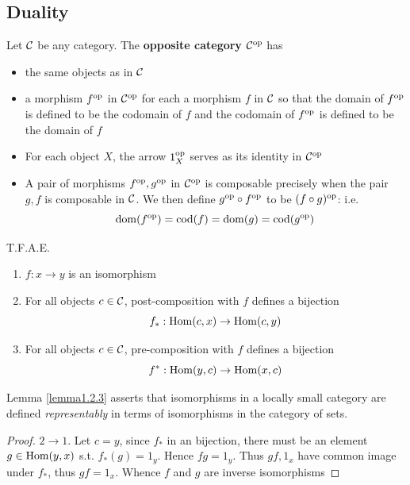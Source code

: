 \documentclass[11pt]{article}
\def \Cop {\calc^{\op}}
\def \fop {f^{\op}}
\def \gop {g^{\op}}
\begin{document}
\subsection{Duality}
\label{sec:orgc070e96}
\begin{definition}[]
Let \(\mathcal{C}\) be any category. The \textbf{opposite category} \(\mathcal{C}^{\operatorname{op}}\) has
\begin{itemize}
\item the same objects as in \(\mathcal{C}\)
\item a morphism \(\fop\) in \(\Cop\) for each a morphism \(f\) in \(\mathcal{C}\) so that the domain
of \(\fop\) is defined to be the codomain of \(f\) and the codomain of \(\fop\) is defined to
be the domain of \(f\)
\item For each object \(X\), the arrow \(1_X^{\operatorname{op}}\) serves as its identity in \(\Cop\)
\item A pair of morphisms \(\fop,\gop\) in \(\Cop\) is composable precisely when the pair \(g,f\) is
composable in \(\mathcal{C}\). We then define \(\gop\circ\fop\) to be \((f\circ g)^{\operatorname{op}}\): i.e.
\begin{equation*}
\dom(\fop)=\cod(f)=\dom(g)=\cod(\gop)
\end{equation*}
\end{itemize}
\end{definition}

\begin{lemma}[]
\label{lemma1.2.3}
T.F.A.E.
\begin{enumerate}
\item \(f:x\to y\) is an isomorphism
\item For all objects \(c\in\mathcal{C}\), post-composition with \(f\) defines a bijection
\begin{equation*}
f_*:\operatorname{Hom}(c,x)\to\operatorname{Hom}(c,y)
\end{equation*}
\item For all objects \(c\in\mathcal{C}\), pre-composition with \(f\) defines a bijection
\begin{equation*}
f^*:\operatorname{Hom}(y,c)\to\operatorname{Hom}(x,c)
\end{equation*}
\end{enumerate}
\end{lemma}

Lemma \ref{lemma1.2.3} asserts that isomorphisms in a locally small category are defined
\emph{representably} in terms of isomorphisms in the category of sets.

\begin{proof}
\(2\to 1\). Let \(c=y\), since \(f_*\) in an bijection, there must be an element \(g\in\operatorname{Hom}(y,x)\)
s.t. \(f_*(g)=1_y\). Hence \(fg=1_y\). Thus \(gf,1_x\) have common image under \(f_*\),
thus \(gf=1_x\). Whence \(f\) and \(g\) are inverse isomorphisms
\end{proof}
\end{document}
